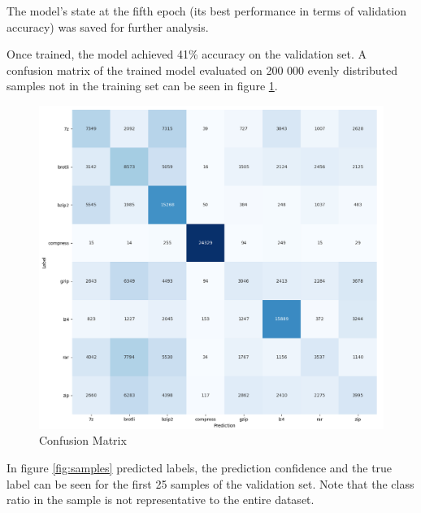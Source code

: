 \documentclass[conference]{IEEEtran}
\begin{document}
The model's state at the fifth epoch (its best performance in terms of validation accuracy) was saved for further analysis.

Once trained, the model achieved 41\% accuracy on the validation set. A confusion matrix of the trained model evaluated on 200 000 evenly distributed samples not in the training set can be seen in figure \ref{fig:confusion-matrix}.

\begin{figure}
    \centering
    \includegraphics[scale=0.25]{confusion-matrix.png}
    \caption{Confusion Matrix}
    \label{fig:confusion-matrix}
\end{figure}

In figure \ref{fig:samples} predicted labels, the prediction confidence and the true label can be seen for the first 25 samples of the validation set. Note that the class ratio in the sample is not representative to the entire dataset.
\end{document}
